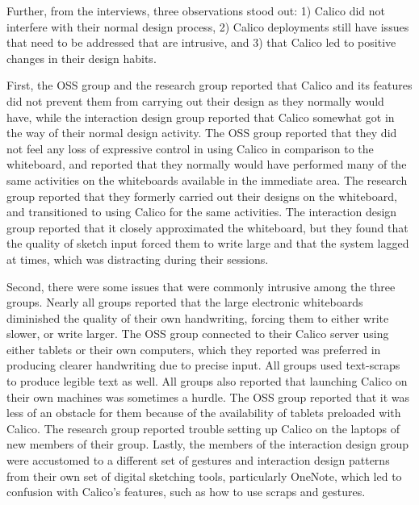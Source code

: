 Further, from the interviews, three observations stood out: 1) Calico did not interfere with their normal design process, 2) Calico deployments still have issues that need to be addressed that are intrusive, and 3) that Calico led to positive changes in their design habits.

First, the OSS group and the research group reported that Calico and its features did not prevent them from carrying out their design as they normally would have, while the interaction design group reported that Calico somewhat got in the way of their normal design activity. The OSS group reported that they did not feel any loss of expressive control in using Calico in comparison to the whiteboard, and reported that they normally would have performed many of the same activities on the whiteboards available in the immediate area. The research group reported that they formerly carried out their designs on the whiteboard, and transitioned to using Calico for the same activities. The interaction design group reported that it closely approximated the whiteboard, but they found that the quality of sketch input forced them to write large and that the system lagged at times, which was distracting during their sessions.


Second, there were some issues that were commonly intrusive among the three groups. Nearly all groups reported that the large electronic whiteboards diminished the quality of their own handwriting, forcing them to either write slower, or write larger. The OSS group connected to their Calico server using either tablets or their own computers, which they reported was preferred in producing clearer handwriting due to precise input. All groups used text-scraps to produce legible text as well. All groups also reported that launching Calico on their own machines was sometimes a hurdle. The OSS group reported that it was less of an obstacle for them because of the availability of tablets preloaded with Calico. The research group reported trouble setting up Calico on the laptops of new members of their group. Lastly, the members of the interaction design group were accustomed to a different set of gestures and interaction design patterns from their own set of digital sketching tools, particularly OneNote, which led to confusion with Calico's features, such as how to use scraps and gestures.

